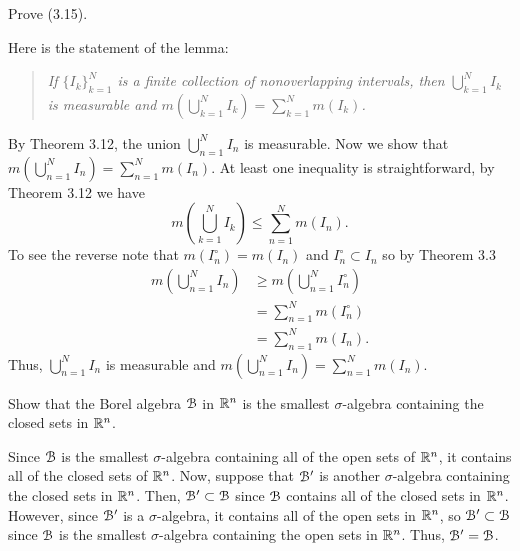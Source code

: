 \begin{problem}
  Prove (3.15).
\end{problem}
\begin{solution}
  Here is the statement of the lemma:
  \begin{quote}
    \emph{If ${\{I_k\}}_{k=1}^{N}$ is a finite collection of nonoverlapping
      intervals, then $\bigcup_{k=1}^NI_k$ is measurable and
      $m\left(\bigcup_{k=1}^NI_k\right)=\sum_{k=1}^Nm(I_k)$.}
  \end{quote}
  By Theorem 3.12, the union $\bigcup_{n=1}^N I_n$ is measurable. Now we
  show that $m\left(\bigcup_{n=1}^NI_n\right)=\sum_{n=1}^Nm(I_n)$. At least
  one inequality is straightforward, by Theorem 3.12 we have
  \[
    m\left(\bigcup_{k=1}^N I_k\right)\leq\sum_{n=1}^Nm(I_n).
  \]
  To see the reverse note that $m(I_n^\circ)=m(I_n)$ and
  $I_n^\circ\subset I_n$ so by Theorem 3.3
  \begin{align*}
    m\left(\bigcup_{n=1}^NI_n\right)
    &\geq m\left(\bigcup_{n=1}^NI_n^\circ\right)\\
    &=\sum_{n=1}^Nm(I_n^\circ)\\
    &=\sum_{n=1}^Nm(I_n).
  \end{align*}
  Thus, $\bigcup_{n=1}^N I_n$ is measurable and
  $m\left(\bigcup_{n=1}^NI_n\right)=\sum_{n=1}^Nm(I_n)$.
\end{solution}

\begin{problem}
  Show that the Borel algebra $\mathcal{B}$ in $\mathbb{R}^n$ is the smallest
  $\sigma$-algebra containing the closed sets in $\mathbb{R}^n$.
\end{problem}
\begin{solution}
  Since $\mathcal{B}$ is the smallest $\sigma$-algebra containing all of the open
  sets of $\mathbb{R}^n$, it contains all of the closed sets of $\mathbb{R}^n$. Now,
  suppose that $\mathcal{B}'$ is another $\sigma$-algebra containing the closed
  sets in $\mathbb{R}^n$. Then, $\mathcal{B}'\subset\mathcal{B}$ since $\mathcal{B}$ contains all
  of the closed sets in $\mathbb{R}^n$. However, since $\mathcal{B}'$ is a
  $\sigma$-algebra, it contains all of the open sets in $\mathbb{R}^n$, so
  $\mathcal{B}'\subset\mathcal{B}$ since $\mathcal{B}$ is the smallest $\sigma$-algebra
  containing the open sets in $\mathbb{R}^n$. Thus, $\mathcal{B}'=\mathcal{B}$.
\end{solution}

